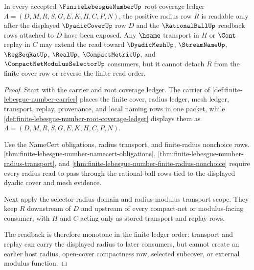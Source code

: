 \begin{theorem}
\label{thm:finite-lebesgue-number-radius-cover-monotone-readback}
In every accepted $\FiniteLebesgueNumberUp$ root coverage ledger $\Lambda=(D,M,R,S,G,E,K,H,C,P,N)$, the positive radius row $R$ is readable only after the displayed $\DyadicCoverUp$ row $D$ and the $\RationalBallUp$ readback rows attached to $D$ have been exposed. Any $\hsame$ transport in $H$ or $\Cont$ replay in $C$ may extend the read toward $\DyadicMeshUp$, $\StreamNameUp$, $\RegSeqRatUp$, $\RealUp$, $\CompactMetricUp$, and $\CompactNetModulusSelectorUp$ consumers, but it cannot detach $R$ from the finite cover row or reverse the finite read order.
\end{theorem}
\begin{proof}
Start with the carrier and root coverage ledger. The carrier of \autoref{def:finite-lebesgue-number-carrier} places the finite cover, radius ledger, mesh ledger, transport, replay, provenance, and local naming rows in one packet, while \autoref{def:finite-lebesgue-number-root-coverage-ledger} displays them as $\Lambda=(D,M,R,S,G,E,K,H,C,P,N)$.

Use the NameCert obligations, radius transport, and finite-radius nonchoice rows. \autoref{thm:finite-lebesgue-number-namecert-obligations}, \autoref{thm:finite-lebesgue-number-radius-transport}, and \autoref{thm:finite-lebesgue-number-finite-radius-nonchoice} require every radius read to pass through the rational-ball rows tied to the displayed dyadic cover and mesh evidence.

Next apply the selector-radius domain and radius-modulus transport scope. They keep $R$ downstream of $D$ and upstream of every compact-net or modulus-facing consumer, with $H$ and $C$ acting only as stored transport and replay rows.

The readback is therefore monotone in the finite ledger order: transport and replay can carry the displayed radius to later consumers, but cannot create an earlier host radius, open-cover compactness row, selected subcover, or external modulus function.
\end{proof}

